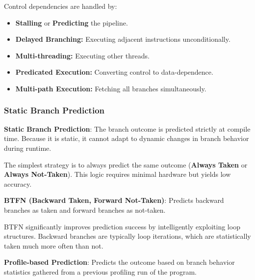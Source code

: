 \begin{remark}
	Control dependencies are handled by:
	\begin{itemize}
		\item \textbf{Stalling} or \textbf{Predicting} the pipeline.
		\item \textbf{Delayed Branching:} Executing adjacent instructions unconditionally.
		\item \textbf{Multi-threading:} Executing other threads.
		\item \textbf{Predicated Execution:} Converting control to data-dependence.
		\item \textbf{Multi-path Execution:} Fetching all branches simultaneously.
	\end{itemize}
\end{remark}

\subsubsection{Static Branch Prediction}

\begin{definition}
	\textbf{Static Branch Prediction}: The branch outcome is predicted strictly at compile time. Because it is static, it cannot adapt to dynamic changes in branch behavior during runtime.
\end{definition}

\begin{remark}
	The simplest strategy is to always predict the same outcome (\textbf{Always Taken} or \textbf{Always Not-Taken}). This logic requires minimal hardware but yields low accuracy.
\end{remark}

\begin{definition}
	\textbf{BTFN (Backward Taken, Forward Not-Taken)}: Predicts backward branches as taken and forward branches as not-taken.
\end{definition}
\begin{remark}
	BTFN significantly improves prediction success by intelligently exploiting loop structures. Backward branches are typically loop iterations, which are statistically taken much more often than not.
\end{remark}

\begin{definition}
	\textbf{Profile-based Prediction}: Predicts the outcome based on branch behavior statistics gathered from a previous profiling run of the program.
\end{definition}


